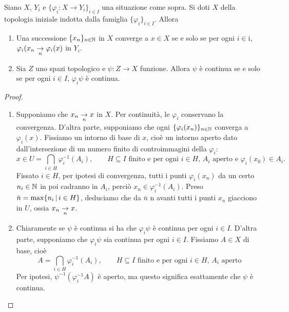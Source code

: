 \begin{theorem}
\label{th:weak_conv_and_cont}
	Siano $X$, $Y_i$ e $\{\varphi_i : X \to Y_i\}_{i \in I}$ una situazione come sopra. Si doti $X$ della topologia iniziale indotta dalla famiglia $\{\varphi_i\}_{i \in I}$.
	Allora
	\begin{enumerate}
		\item Una successione $\{x_n\}_{n \in \N}$ in $X$ converge a $x \in X$ se e solo se per ogni $i \in $i, $\varphi_i(x_n \conv[n] \varphi_i(x)$ in $Y_i$.
		\item Sia $Z$ uno spazi topologico e $\psi : Z \to X$ funzione. Allora $\psi$ è continua se e solo se per ogni $i \in I$, $\varphi_i\psi$ è continua.
	\end{enumerate}
\end{theorem}
\begin{proof}
	\leavevmode
	\begin{enumerate}
		\item Supponiamo che $x_n \conv[n] x$ in $X$. Per continuità, le $\varphi_i$ conservano la convergenza. D'altra parte, supponiamo che ogni $\{\varphi_i(x_n)\}_{n \in \N}$ converga a $\varphi_i(x)$. Fissiamo un intorno di base di $x$, cioè un intorno aperto dato dall'intersezione di un numero finito di controimmagini della $\varphi_i$:
		\begin{equation*}
			x \in U=\bigcap_{i \in H} \varphi_i^{-1}(A_i), \qquad \text{$H \subseteq I$ finito e per ogni $i \in H$, $A_i$ aperto e $\varphi_i(x_0) \in A_i$}.
		\end{equation*}
		Fissato $i \in H$, per ipotesi di convergenza, tutti i punti $\varphi_i(x_n)$ da un certo $n_i \in \N$ in poi cadranno in $A_i$, perciò $x_n \in \varphi_i^{-1}(A_i)$. Preso $\bar n = \max \{n_i \suchthat i \in H\}$, deduciamo che da $\bar n$ n avanti tutti i punti $x_n$ giacciono in $U$, ossia $x_n \conv[n] x$.
		\item Chiaramente se $\psi$ è continua si ha che $\varphi_i \psi$ è continua per ogni $i \in I$. D'altra parte, supponiamo che $\varphi_i \psi$ sia continua per ogni $i \in I$. Fissiamo $A \in X$ di base, cioè
		\begin{equation*}
			A = \bigcap_{i \in H} \varphi_i^{-1}(A_i), \qquad \text{$H \subseteq I$ finito e per ogni $i \in H$, $A_i$ aperto}
		\end{equation*}
		Per ipotesi, $\psi^{-1}(\varphi_i^{-1}A)$ è aperto, ma questo significa esattamente che $\psi$ è continua.
	\end{enumerate}
\end{proof}

